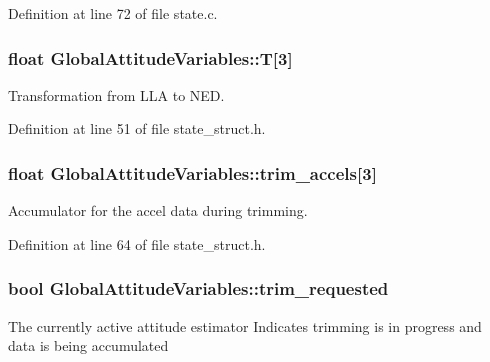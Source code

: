 \-Definition at line 72 of file state.\-c.

\hypertarget{group___state_estimation_filters_ga45b3fda0427f0fab27b88df83ae9108d}{
\subsubsection[{\-T}]{\setlength{\rightskip}{0pt plus 5cm}float {\bf \-Global\-Attitude\-Variables\-::\-T}\mbox{[}3\mbox{]}}}\label{group___state_estimation_filters_ga45b3fda0427f0fab27b88df83ae9108d}


\-Transformation from \-L\-L\-A to \-N\-E\-D. 



\-Definition at line 51 of file state\-\_\-struct.\-h.

\hypertarget{group___state_estimation_filters_ga8941c16a263cb020587ef58dd38f8281}{
\subsubsection[{trim\-\_\-accels}]{\setlength{\rightskip}{0pt plus 5cm}float {\bf \-Global\-Attitude\-Variables\-::trim\-\_\-accels}\mbox{[}3\mbox{]}}}\label{group___state_estimation_filters_ga8941c16a263cb020587ef58dd38f8281}


\-Accumulator for the accel data during trimming. 



\-Definition at line 64 of file state\-\_\-struct.\-h.

\hypertarget{group___state_estimation_filters_ga1b90881e0b0eb5aa9cf39d0ba8ef5e0d}{
\subsubsection[{trim\-\_\-requested}]{\setlength{\rightskip}{0pt plus 5cm}bool {\bf \-Global\-Attitude\-Variables\-::trim\-\_\-requested}}}\label{group___state_estimation_filters_ga1b90881e0b0eb5aa9cf39d0ba8ef5e0d}
\-The currently active attitude estimator \-Indicates trimming is in progress and data is being accumulated 

